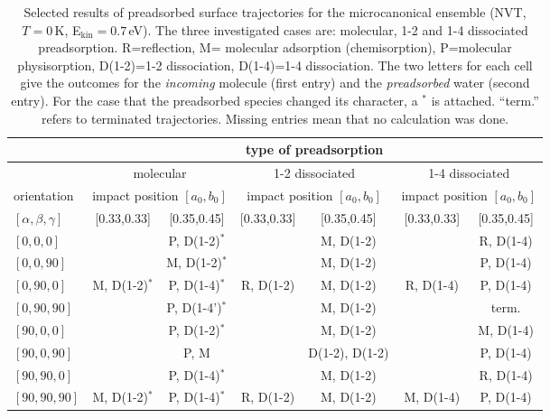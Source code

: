 \documentclass[11pt,DIV=13,BCOR=5mm,a4paper,headinclude]{scrbook}
\begin{document}
\begin{table}[!h]
  \centering
  \caption{Selected results of preadsorbed surface trajectories for the microcanonical ensemble (NVT, $T=0\,$K, E$_\textrm{kin}=0.7\,$eV).
The three investigated cases are: molecular, 1-2 and 1-4 dissociated preadsorption.
R=reflection, M= molecular adsorption (chemisorption), P=molecular physisorption, D(1-2)=1-2 dissociation, D(1-4)=1-4 dissociation.
The two letters for each cell give the outcomes for the \textit{incoming} molecule (first entry) and the \textit{preadsorbed} water (second entry).
For the case that the preadsorbed species changed its character, a $^*$ is attached.
``term.'' refers to terminated trajectories.
Missing entries mean that no calculation was done.}
\hspace*{-1cm}
 \begin{tabular}{l|cc|cc|cc}
 \toprule
               & \multicolumn{6}{c}{type of preadsorption } \\\hline
               & \multicolumn{2}{c|}{molecular} & \multicolumn{2}{c|}{1-2 dissociated} & \multicolumn{2}{c}{1-4 dissociated} \\\hline
    orientation& \multicolumn{2}{c|}{impact position $[a_0,b_0]$} & \multicolumn{2}{c|}{impact position $[a_0,b_0]$} & \multicolumn{2}{c}{impact position $[a_0,b_0]$} \\
    $[\alpha,\beta,\gamma]$ & [0.33,0.33] & [0.35,0.45] & [0.33,0.33] & [0.35,0.45] & [0.33,0.33] & [0.35,0.45] \\
    \midrule
   $[0,0,0]$    &          & P, D(1-2)$^*$  &  & M, D(1-2) &  & R, D(1-4) \\
   $[0,0,90]$   &          & M, D(1-2)$^*$  &  & M, D(1-2) &  & P, D(1-4) \\
   $[0,90,0]$   & M, D(1-2)$^*$ & P, D(1-4)$^*$  & R, D(1-2) & M, D(1-2) & R, D(1-4) & P, D(1-4) \\
   $[0,90,90]$  &          & P, D(1-4')$^*$ &  & M, D(1-2) &          & term.
\\
   $[90,0,0]$   &          & P, D(1-2)$^*$  &  & M, D(1-2) &  & M, D(1-4) \\
   $[90,0,90]$  &          & P, M      &  & D(1-2), D(1-2) &  & P, D(1-4) \\
   $[90,90,0]$  &          & P, D(1-4)$^*$  &  & M, D(1-2) &  & R, D(1-4) \\
   $[90,90,90]$ & M, D(1-2)$^*$ & P, D(1-4)$^*$  & R, D(1-2) & M, D(1-2) & M, D(1-4) & P, D(1-4)
\\\hline
  \end{tabular}
  \label{tab:preads_mic}
\end{table}
\end{document}
